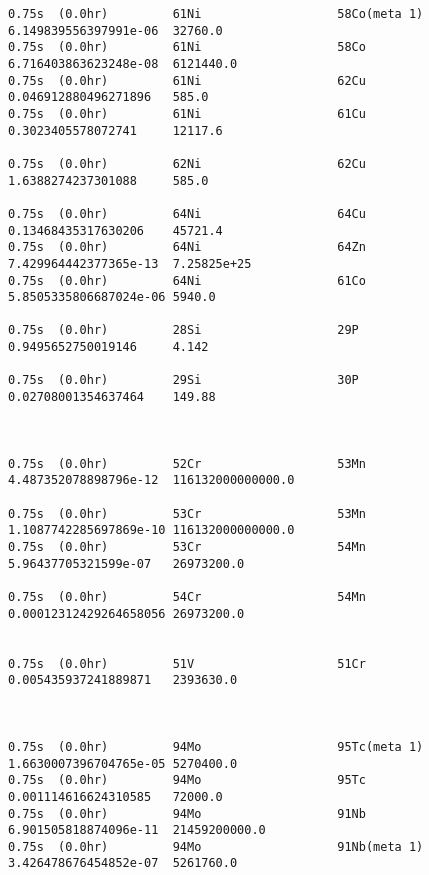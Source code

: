 \begin{lstlisting}[style=sOutputFile,caption={Final results for steel irradiation},label={listing:alexsteel}]
0.75s  (0.0hr)         61Ni                   58Co(meta 1)           6.149839556397991e-06  32760.0               
0.75s  (0.0hr)         61Ni                   58Co                   6.716403863623248e-08  6121440.0             
0.75s  (0.0hr)         61Ni                   62Cu                   0.046912880496271896   585.0                 
0.75s  (0.0hr)         61Ni                   61Cu                   0.3023405578072741     12117.6               

0.75s  (0.0hr)         62Ni                   62Cu                   1.6388274237301088     585.0                 

0.75s  (0.0hr)         64Ni                   64Cu                   0.13468435317630206    45721.4               
0.75s  (0.0hr)         64Ni                   64Zn                   7.429964442377365e-13  7.25825e+25           
0.75s  (0.0hr)         64Ni                   61Co                   5.8505335806687024e-06 5940.0                

0.75s  (0.0hr)         28Si                   29P                    0.9495652750019146     4.142                 

0.75s  (0.0hr)         29Si                   30P                    0.02708001354637464    149.88                



0.75s  (0.0hr)         52Cr                   53Mn                   4.487352078898796e-12  116132000000000.0     

0.75s  (0.0hr)         53Cr                   53Mn                   1.1087742285697869e-10 116132000000000.0     
0.75s  (0.0hr)         53Cr                   54Mn                   5.96437705321599e-07   26973200.0            

0.75s  (0.0hr)         54Cr                   54Mn                   0.00012312429264658056 26973200.0            


0.75s  (0.0hr)         51V                    51Cr                   0.005435937241889871   2393630.0             



0.75s  (0.0hr)         94Mo                   95Tc(meta 1)           1.6630007396704765e-05 5270400.0             
0.75s  (0.0hr)         94Mo                   95Tc                   0.001114616624310585   72000.0               
0.75s  (0.0hr)         94Mo                   91Nb                   6.901505818874096e-11  21459200000.0         
0.75s  (0.0hr)         94Mo                   91Nb(meta 1)           3.426478676454852e-07  5261760.0             


\end{lstlisting}
